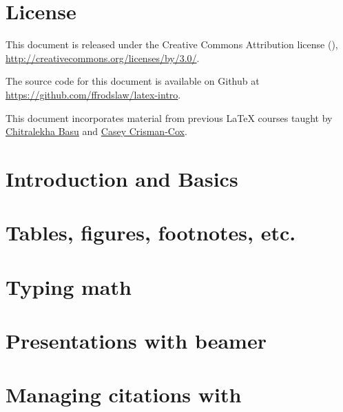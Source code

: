 


\begin{titlepage}

\maketitle

\vspace*{4cm}
\thispagestyle{empty}

\end{titlepage}


\newpage

\section*{License}
\thispagestyle{empty}

\noindent%
This document is released under the Creative Commons Attribution license
(\ccby), {\small \url{http://creativecommons.org/licenses/by/3.0/}}.

\bigskip%
\noindent%
The source code for this document is available on Github at
{\small \url{https://github.com/ffrodslaw/latex-intro}}.

\bigskip%
\noindent%
This document incorporates material from previous \LaTeX{} courses taught by \href{http://www.chitralekha-basu.com/uploads/6/3/0/3/63033901/latex_for_absolute_beginners_-_part_one.pdf}{Chitralekha Basu} and  \href{https://drive.google.com/open?id=0BzD2LimxGIzIY083V0EzQUt6UmM}{Casey Crisman-Cox}.

\pagebreak

\tableofcontents
\thispagestyle{empty}

\pagebreak
\setcounter{page}{1}

\section{Introduction and Basics}


\section{Tables, figures, footnotes, etc.}


\section{Typing math}


\section{Presentations with beamer}
	

\section{Managing citations with }



%



